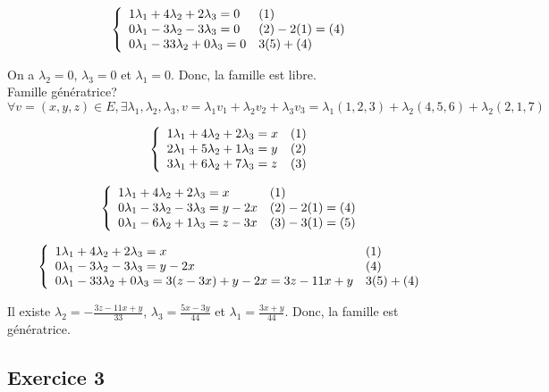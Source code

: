 \documentclass[]{book}
\theoremstyle{definition}
\begin{document}
$$
\left\{ 
\begin{array}{l l}
1 \lambda_1 + 4 \lambda_2 + 2 \lambda_3 = 0 & (1)\\
0 \lambda_1 - 3 \lambda_2 - 3 \lambda_3 = 0 & (2) - 2(1) = (4)\\
0 \lambda_1 - 33 \lambda_2 + 0 \lambda_3 = 0 & 3(5) + (4)\\
\end{array}
\right. 
$$ 


On a $\lambda_2 = 0$, $\lambda_3 = 0$ et $\lambda_1 = 0$. Donc, la famille est libre. \\

Famille g\'en\'eratrice?
$$\forall v = (x,y,z) \in E, \exists \lambda_1, \lambda_2, \lambda_3, v = \lambda_1 v_1 + \lambda_2 v_2 + \lambda_3 v_3 = \lambda_1 (1,2,3) + \lambda_2 (4,5,6) + \lambda_2 (2,1,7)$$

$$
\left\{ 
\begin{array}{l l}
1 \lambda_1 + 4 \lambda_2 + 2 \lambda_3 = x & (1)\\
2 \lambda_1 + 5 \lambda_2 + 1 \lambda_3 = y & (2)\\
3 \lambda_1 + 6 \lambda_2 + 7 \lambda_3 = z & (3)\\
\end{array}
\right. 
$$ 

$$
\left\{ 
\begin{array}{l l}
1 \lambda_1 + 4 \lambda_2 + 2 \lambda_3 = x & (1)\\
0 \lambda_1 - 3 \lambda_2 - 3 \lambda_3 = y-2x & (2) - 2(1) = (4)\\
0 \lambda_1 - 6 \lambda_2 + 1 \lambda_3 = z-3x & (3) - 3(1) = (5)\\
\end{array}
\right. 
$$ 

$$
\left\{ 
\begin{array}{l l}
1 \lambda_1 + 4 \lambda_2 + 2 \lambda_3 = x & (1)\\
0 \lambda_1 - 3 \lambda_2 - 3 \lambda_3 = y-2x & (4)\\
0 \lambda_1 - 33 \lambda_2 + 0 \lambda_3 = 3(z-3x)+y-2x = 3z-11x+y & 3(5) + (4)\\
\end{array}
\right. 
$$ 


Il existe $\lambda_2 = -\frac{3z-11x+y}{33}$, $\lambda_3 = \frac{5x -3y}{44}$ et $\lambda_1 = \frac{3x + y}{44}$. Donc, la famille est g\'en\'eratrice.


\subsection*{Exercice 3}
\end{document}
